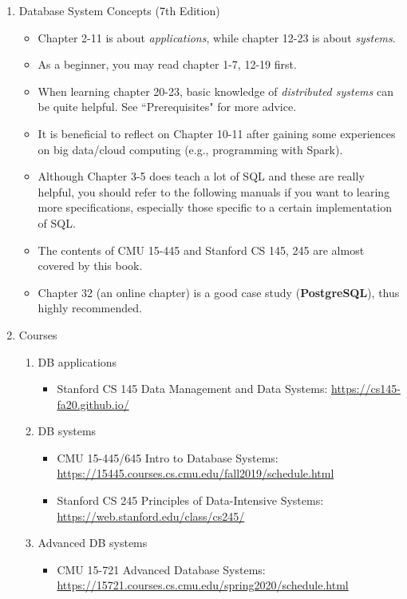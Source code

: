\documentclass{article}
\begin{document}
\begin{enumerate}
    \item Database System Concepts (7th Edition) \cite{silberschatz2002database}
    \begin{itemize}
        \item Chapter 2-11 is about \emph{applications}, while chapter 12-23 is about \emph{systems}.
        \item As a beginner, you may read chapter 1-7, 12-19 first.        
        \item When learning chapter 20-23, basic knowledge of \emph{distributed systems} can be quite helpful.
        See ``Prerequisites" for more advice.
        \item It is beneficial to reflect on Chapter 10-11 after gaining some experiences on big data/cloud computing (e.g., programming with Spark).
        \item Although Chapter 3-5 does teach a lot of SQL and these are really helpful, you should refer to the following manuals if you want to learing more specifications, especially those specific to a certain implementation of SQL.
        \item The contents of CMU 15-445 and Stanford CS 145, 245 are almost covered by this book.
        \item Chapter 32 (an online chapter) is a good case study (\textbf{PostgreSQL}), thus highly recommended.
    \end{itemize}
    \item Courses
    \begin{enumerate}
        \item DB applications
        \begin{itemize}
            \item Stanford CS 145 Data Management and Data Systems:
            \href{https://cs145-fa20.github.io/}{https://cs145-fa20.github.io/}
        \end{itemize}
        \item DB systems
        \begin{itemize}
            \item CMU 15-445/645 Intro to Database Systems:\\
            \href{https://15445.courses.cs.cmu.edu/fall2019/schedule.html}{https://15445.courses.cs.cmu.edu/fall2019/schedule.html}
            \item Stanford CS 245 Principles of Data-Intensive Systems:\\
            \href{https://web.stanford.edu/class/cs245/}{https://web.stanford.edu/class/cs245/}
        \end{itemize}
            \item Advanced DB systems
            \begin{itemize}
                \item CMU 15-721 Advanced Database Systems:\\
                \href{https://15721.courses.cs.cmu.edu/spring2020/schedule.html}{https://15721.courses.cs.cmu.edu/spring2020/schedule.html}        
            \end{itemize}
    \end{enumerate}


\end{enumerate}
\end{document}
